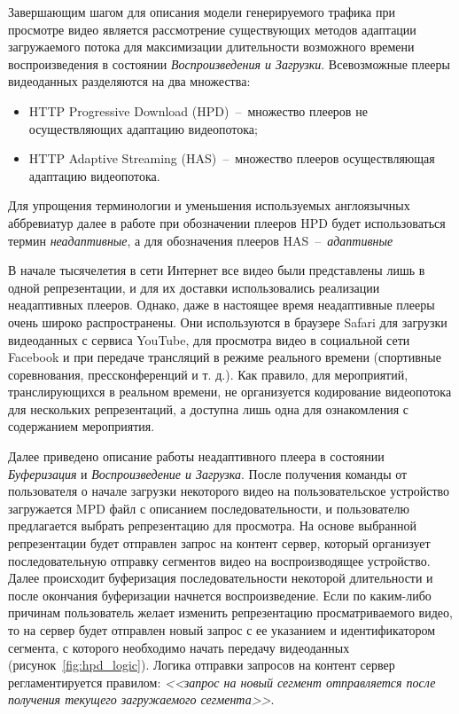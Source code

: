 Завершающим шагом для описания модели генерируемого трафика при просмотре видео является рассмотрение существующих методов адаптации загружаемого потока для максимизации длительности возможного времени воспроизведения в состоянии \textit{Воспроизведения и Загрузки}. Всевозможные плееры видеоданных разделяются на два множества:
\begin{itemize}
  \item HTTP Progressive Download (HPD)~--~множество плееров не осуществляющих адаптацию видеопотока;
  \item HTTP Adaptive Streaming (HAS)~--~множество плееров осуществляющая адаптацию видеопотока.
\end{itemize}
Для упрощения терминологии и уменьшения используемых англоязычных аббревиатур далее в работе при обозначении плееров HPD будет использоваться термин \textit{неадаптивные}, а для обозначения плееров HAS~--~\textit{адаптивные}

В начале тысячелетия в сети Интернет все видео были представлены лишь в одной репрезентации, и для их доставки использовались реализации неадаптивных плееров. Однако, даже в настоящее время неадаптивные плееры очень широко распространены. Они используются в браузере Safari для загрузки видеоданных с сервиса YouTube, для просмотра видео в социальной сети Facebook и при передаче трансляций в режиме реального времени (спортивные соревнования, прессконференций и т. д.). Как правило, для мероприятий, транслирующихся в реальном времени, не организуется кодирование видеопотока для нескольких репрезентаций, а доступна лишь одна для ознакомления с содержанием мероприятия.

Далее приведено описание работы неадаптивного плеера в состоянии \textit{Буферизация} и \textit{Воспроизведение и Загрузка}. После получения команды от пользователя о начале загрузки некоторого видео на пользовательское устройство загружается MPD файл с описанием последовательности, и пользователю предлагается выбрать репрезентацию для просмотра. На основе выбранной репрезентации будет отправлен запрос на контент сервер, который организует последовательную отправку сегментов видео на воспроизводящее устройство. Далее происходит буферизация последовательности некоторой длительности и после окончания буферизации начнется воспроизведение. Если по каким-либо причинам пользователь желает изменить репрезентацию просматриваемого видео, то на сервер будет отправлен новый запрос с ее указанием и идентификатором сегмента, с которого необходимо начать передачу видеоданных (рисунок~\ref{fig:hpd_logic}). Логика отправки запросов на контент сервер регламентируется правилом: \textit{<<запрос на новый сегмент отправляется после получения текущего загружаемого сегмента>>}.


